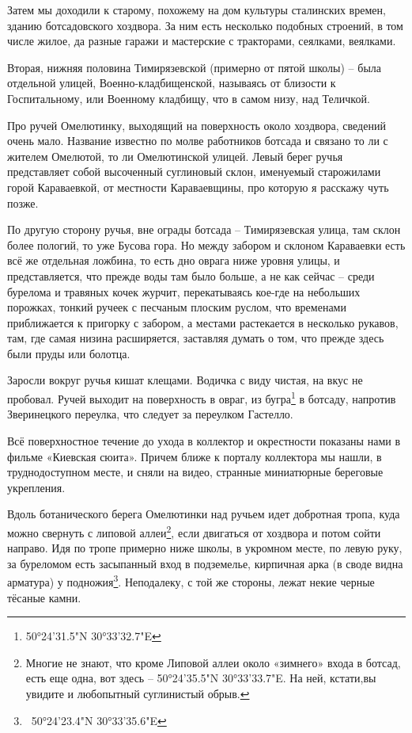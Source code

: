 Затем мы доходили к старому, похожему на дом культуры сталинских времен, зданию ботсадовского хоздвора. За ним есть несколько подобных строений, в том числе жилое, да разные гаражи и мастерские с тракторами, сеялками, веялками.

Вторая, нижняя половина Тимирязевской (примерно от пятой школы) – была отдельной улицей, Военно-кладбищенской, называясь от близости к Госпитальному, или Военному кладбищу, что в самом низу, над Теличкой.

Про ручей Омелютинку, выходящий на поверхность около хоздвора, сведений очень мало. Название известно по молве работников ботсада и связано то ли с жителем Омелютой, то ли Омелютинской улицей. Левый берег ручья представляет собой высоченный суглиновый склон, именуемый старожилами горой Караваевкой, от местности Караваевщины, про которую я расскажу чуть позже. 

По другую сторону ручья, вне ограды ботсада – Тимирязевская улица, там склон более пологий, то уже Бусова гора. Но между забором и склоном Караваевки есть всё же отдельная ложбина, то есть дно оврага ниже уровня улицы, и представляется, что прежде воды там было больше, а не как сейчас – среди бурелома и травяных кочек журчит, перекатываясь кое-где на небольших порожках, тонкий ручеек с песчаным плоским руслом, что временами приближается к пригорку с забором, а местами растекается в несколько рукавов, там, где самая низина расширяется, заставляя думать о том, что прежде здесь были пруды или болотца.

Заросли вокруг ручья кишат клещами. Водичка с виду чистая, на вкус не пробовал. Ручей выходит на поверхность в овраг, из бугра\footnote{50°24'31.5"N 30°33'32.7"E} в ботсаду, напротив Зверинецкого переулка, что следует за переулком Гастелло.

Всё поверхностное течение до ухода в коллектор и окрестности показаны нами в фильме «Киевская сюита». Причем ближе к порталу коллектора мы нашли, в труднодоступном месте, и сняли на видео, странные миниатюрные береговые укрепления.

Вдоль ботанического берега Омелютинки над ручьем идет добротная тропа, куда можно свернуть с липовой аллеи\footnote{Многие не знают, что кроме Липовой аллеи около «зимнего» входа в ботсад, есть еще одна, вот здесь – 50°24'35.5"N 30°33'33.7"E. На ней, кстати,вы увидите и любопытный суглинистый обрыв.}, если двигаться от хоздвора и потом сойти направо. Идя по тропе примерно ниже школы, в укромном месте, по левую руку, за буреломом есть засыпанный вход в подземелье, кирпичная арка (в своде видна арматура) у подножия\footnote{~50°24'23.4"N 30°33'35.6"E}. Неподалеку, с той же стороны, лежат некие черные тёсаные камни.

